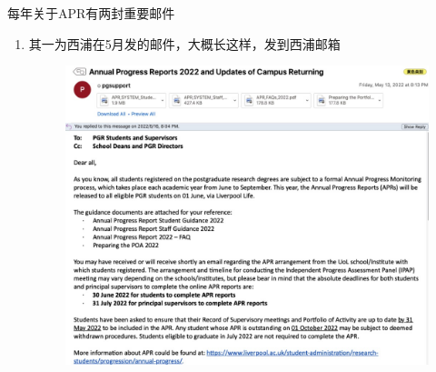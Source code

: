 每年关于APR有两封重要邮件
\begin{enumerate}
    \item 
        \begin{minipage}{0.3\textwidth}
            其一为西浦在5月发的邮件，大概长这样，发到西浦邮箱
        \end{minipage}
        \begin{minipage}{0.63\textwidth}
            \begin{figure}[H]
                \includegraphics[width=0.95\columnwidth, right]{author-folder/Kai.Wu/APR_email.jpg}
            \end{figure}
        \end{minipage}


\end{enumerate}
